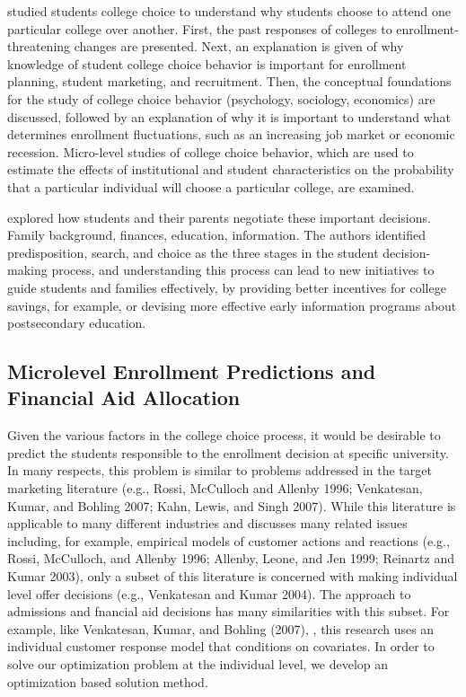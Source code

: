 \documentclass[12pt,english]{report}
\begin{document}
\citet{Paulsen1990} studied students college choice to understand why students
choose to attend one particular college over another. First, the past responses
of colleges to enrollment-threatening changes are presented. Next, an
explanation is given of why knowledge of student college choice behavior is
important for enrollment planning, student marketing, and recruitment. Then,
the conceptual foundations for the study of college choice behavior
(psychology, sociology, economics) are discussed, followed by an explanation of
why it is important to understand what determines enrollment fluctuations, such
as an increasing job market or economic recession. Micro-level studies of
college choice behavior, which are used to estimate the effects of
institutional and student characteristics on the probability that a particular
individual will choose a particular college, are examined.

\citet{Hossler1998} explored how students and their parents negotiate these
important decisions. Family background, finances, education, information. The
authors identified predisposition, search, and choice as the three stages in
the student decision-making process, and understanding this process can lead to
new initiatives to guide students and families effectively, by providing better
incentives for college savings, for example, or devising more effective early
information programs about postsecondary education.

\subsection{Microlevel Enrollment Predictions and Financial Aid Allocation} 
Given the various factors in the college choice process, it would be desirable
to predict the students responsible to the enrollment decision at specific
university.  In many respects, this problem is similar to problems addressed in
the target marketing literature (e.g., Rossi, McCulloch and Allenby 1996;
Venkatesan, Kumar, and Bohling 2007; Kahn, Lewis, and Singh 2007). While this
literature is applicable to many different industries and discusses many
related issues including, for example, empirical models of customer actions and
reactions (e.g., Rossi, McCulloch, and Allenby 1996; Allenby, Leone, and Jen
1999; Reinartz and Kumar 2003), only a subset of this literature is concerned
with making individual level offer decisions (e.g., Venkatesan and Kumar 2004).
The approach to admissions and fnancial aid decisions has many similarities
with this subset.  For example, like Venkatesan, Kumar, and Bohling (2007),
\citep{Carter2011}, this research uses an individual customer response model
that conditions on covariates.  In order to solve our optimization problem at
the individual level, we develop an optimization based solution method.
\end{document}
